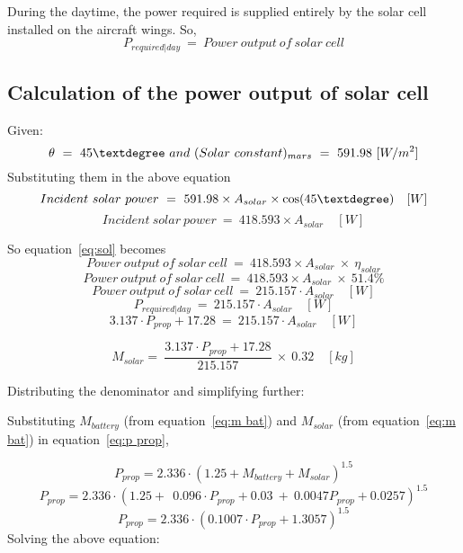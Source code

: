 \p During the daytime, the power required is supplied entirely by the solar cell installed on the aircraft wings. So,
\[ P_{required|day} \ = \ Power \ output \ of \ solar \ cell \]
\subsection{Calculation of the power output of solar cell}
 
Given:
\[ \theta \ = \ 45 \textdegree \ and \  (Solar\ constant)_{mars} \ = \ 591.98 \ [W/m^2] \]
Substituting them in the above equation
\[ Incident \ solar \ power \ = \ 591.98 \times A_{solar} \times \cos(45\textdegree) \quad [W] \]
\[ Incident \ solar \ power \ = \ 418.593 \times A_{solar} \quad [W] \]

So equation~\ref{eq:sol} becomes
\[ Power \ output \ of \ solar \ cell \ = \ 418.593 \times A_{solar} \ \times \ \eta_{solar} \]
\[ Power \ output \ of \ solar \ cell \ = \ 418.593 \times A_{solar} \ \times \ 51.4\% \]
\[ Power \ output \ of \ solar \ cell \ = \ 215.157 \cdot A_{solar} \quad [W] \]
\[ P_{required|day} \ = \ 215.157 \cdot A_{solar} \quad [W] \]
\[ 3.137 \cdot P_{prop} + 17.28 \ = \ 215.157 \cdot A_{solar} \quad [W] \]



\[ M_{solar} = \ \frac{ 3.137 \cdot P_{prop} + 17.28 }{ 215.157 } \ \times \ 0.32 \quad [kg] \]

Distributing the denominator and simplifying further:
\vspace{0.5cm}

\p Substituting $ M_{battery} $ (from equation~\ref{eq:m bat}) and $ M_{solar} $ (from equation~\ref{eq:m bat}) in equation~\ref{eq:p prop},

\[ P_{prop} = 2.336 \cdot (1.25 + M_{battery} + M_{solar})^{1.5} \]
\[ P_{prop} = 2.336 \cdot (1.25 + \ \ 0.096 \cdot P_{prop} + 0.03 \ + \ 0.0047 P_{prop} + 0.0257 )^{1.5} \] 
\[ P_{prop} = 2.336 \cdot ( 0.1007 \cdot P_{prop} + 1.3057 )^{1.5} \]
Solving the above equation:
\boxone

